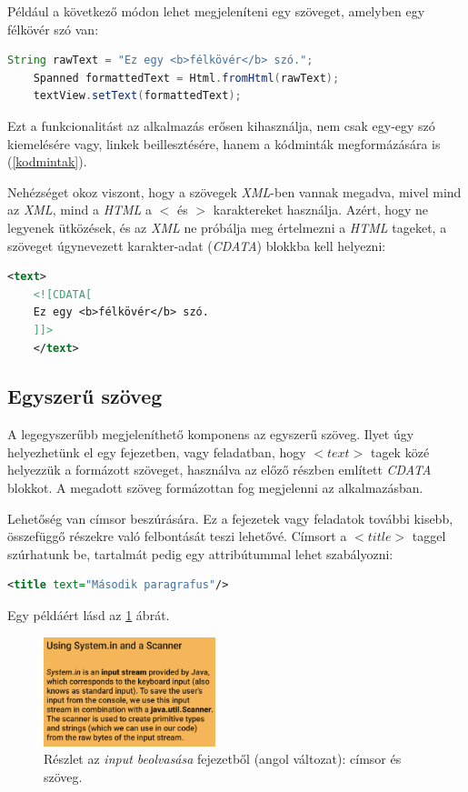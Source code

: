 \documentclass[12pt,a4paper]{article}
\newcommand{\xml}{\textit{XML}\xspace}
\begin{document}
	Például a következő módon lehet megjeleníteni egy szöveget, amelyben egy félkövér szó van:
	
	\bigskip
	\begin{lstlisting}[language=Java]
	String rawText = "Ez egy <b>félkövér</b> szó.";
	Spanned formattedText = Html.fromHtml(rawText);
	textView.setText(formattedText);
	\end{lstlisting}
	\bigskip
	
	Ezt a funkcionalitást az alkalmazás erősen kihasználja, nem csak egy-egy szó kiemelésére vagy, linkek beillesztésére, hanem a kódminták megformázására is (\ref{kodmintak}).
	
	Nehézséget okoz viszont, hogy a szövegek \xml-ben vannak megadva, mivel mind az \xml, mind a \textit{HTML} a $<$ és $>$ karaktereket használja. Azért, hogy ne legyenek ütközések, és az \xml ne próbálja meg értelmezni a \textit{HTML} tageket, a szöveget úgynevezett karakter-adat (\textit{CDATA}) blokkba kell helyezni:
	
	\bigskip
	\begin{lstlisting}[language=XML]
	<text>
	<![CDATA[
	Ez egy <b>félkövér</b> szó.
	]]>
	</text>
	\end{lstlisting}
	
	\subsection{Egyszerű szöveg}
	
	A legegyszerűbb megjeleníthető komponens az egyszerű szöveg. Ilyet úgy helyezhetünk el egy fejezetben, vagy feladatban, hogy $<text>$ tagek közé helyezzük a formázott szöveget, használva az előző részben említett \textit{CDATA} blokkot. A megadott szöveg formázottan fog megjelenni az alkalmazásban.
	
	Lehetőség van címsor beszúrására. Ez a fejezetek vagy feladatok további kisebb, összefüggő részekre való felbontását teszi lehetővé. Címsort a $<title>$ taggel szúrhatunk be, tartalmát pedig egy attribútummal lehet szabályozni:
	
	\bigskip
	\begin{lstlisting}[language=XML]
	<title text="Második paragrafus"/>
	\end{lstlisting}
	\bigskip
	
	Egy példáért lásd az \ref{title_component_figure} ábrát.
	
	\begin{figure}[h!]
		\centering
		\includegraphics[width=5cm]{title_text_component}
		\caption{Részlet az \textit{input beolvasása} fejezetből (angol változat): címsor és szöveg.}
		\label{title_component_figure}
	\end{figure}
	
\end{document}

